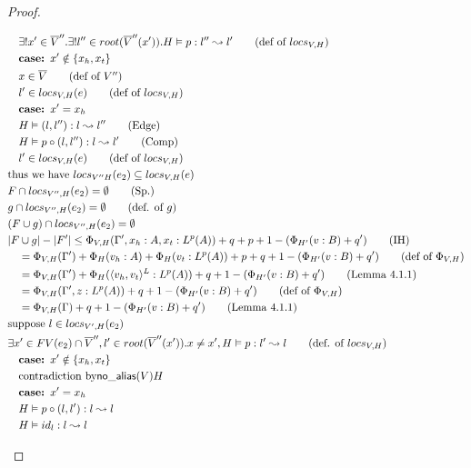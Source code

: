 \documentclass[11pt]{article}
\newcommand{\na}[1]{\mathsf{no\_alias}(#1)}
\begin{document}
\begin{proof}
\begin{description}
\begin{align*}
  &\quad \exists! x' \in \overline V''. \exists! l'' \in root(\overline V''(x')). H \vDash p : l'' \leadsto l' \tag{def of $locs_{V,H}$}\\
  &\quad \textbf{case: } x' \notin \{x_h,x_t\}\\
  &\quad x \in \overline V \tag{def of $V''$}\\
  &\quad l' \in locs_{V,H}(e) \tag{def of $locs_{V,H}$}\\
  &\quad \textbf{case: } x' = x_h\\
  &\quad H \vDash (l,l'') : l \leadsto l'' \tag{Edge}\\
  &\quad H \vDash p \circ (l,l'') : l \leadsto l' \tag{Comp}\\
  &\quad l' \in locs_{V,H}(e) \tag{def of $locs_{V,H}$}\\
  &\text{thus we have } locs_{V''H}(e_2) \subseteq locs_{V,H}(e)\\
  &F \cap locs_{V'',H}(e_2) = \emptyset \tag{Sp.}\\
  &g \cap locs_{V'',H}(e_2) = \emptyset \tag{def. of $g$}\\
  &(F \cup g) \cap locs_{V'',H}(e_2) = \emptyset\\
  &|F \cup g| - |F'| \le  \Phi_{V,H}(\Gamma',x_h:A,x_t:L^p(A)) + q + p + 1 - (\Phi_{H'}(v:B) + q') \tag{IH}\\
  &\quad = \Phi_{V,H}(\Gamma') + \Phi_H(v_h:A) + \Phi_H(v_t:L^p(A)) + p + q + 1 - (\Phi_{H'}(v:B) + q') \tag{def of $\Phi_{V,H}$}\\
  &\quad = \Phi_{V,H}(\Gamma') + \Phi_H(\pairexcst{v_h}{v_t}^L : L^p(A)) + q + 1 - (\Phi_{H'}(v:B) + q') \tag{Lemma 4.1.1}\\
  &\quad = \Phi_{V,H}(\Gamma', z : L^p(A)) + q + 1 - (\Phi_{H'}(v:B) + q') \tag{def of $\Phi_{V,H}$}\\
  &\quad = \Phi_{V,H}(\Gamma) + q + 1 - (\Phi_{H'}(v:B) + q') \tag{Lemma 4.1.1}\\
  &\text{suppose } l \in locs_{V',H}(e_2) \\
  &\exists x' \in FV(e_2) \cap \overline V'', l' \in root(\overline V''(x')). x \ne x', H \vDash p : l' \leadsto l \tag{def. of $locs_{V,H}$}\\
  &\quad\textbf{case: } x' \notin \{x_h,x_t\}\\
  &\quad \text{contradiction by} \na{V}{H}\\ 
  &\quad\textbf{case: } x' = x_h\\
  &\quad H \vDash p \circ (l,l') : l \leadsto l\\
  &\quad H \vDash id_l : l \leadsto l\\

\end{align*}
\end{description}
\end{proof}
\end{document}
